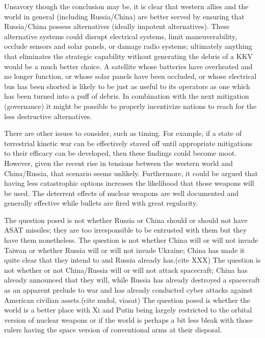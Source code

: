 Unsavory though the conclusion may be, it is clear that western allies
and the world in general (including Russia/China) are better served by
ensuring that Russia/China possess alternatives (ideally impotent
alternatives).  These alternative systems could disrupt electrical
systems, limit maneuverability, occlude sensors and solar panels, or
damage radio systems; ultimately anything that eliminates the
strategic capability without generating the debris of a KKV would be a
much better choice.  A satellite whose batteries have overheated and
no longer function, or whose solar panels have been occluded, or whose
electrical bus has been shorted is likely to be just as useful to its
operators as one which has been turned into a puff of debris.  In
combination with the next mitigation (governance) it might be possible
to properly incentivize nations to reach for the less destructive
alternatives.

There are other issues to consider, such as timing.  For example, if a
state of terrestrial kinetic war can be effectively staved off until
appropriate mitigations to their efficacy can be developed, then these
findings could become moot.  However, given the recent rise in
tensions between the western world and China/Russia, that scenario
seems unlikely.  Furthermore, it could be argued that having less
catastrophic options increases the likelihood that those weapons will
be used.  The deterrent effects of nuclear weapons are well documented
and generally effective\cite[mad]{xxx} while bullets are fired with
great regularity.

The question posed is not whether Russia or China should or should not
have ASAT missiles; they are too irresponsible to be entrusted with
them but they have them nonetheless.  The question is not whether
China will or will not invade Taiwan or whether Russia will or will
not invade Ukraine; China has made it quite clear that they intend to
and Russia already has.(cite XXX) The question is not whether or not
China/Russia will or will not attack spacecraft; China has already
announced that they will, while Russia has already destroyed a
spacecraft as an apparent prelude to war and has already conducted
cyber attacks against American civilian assets.(cite nudol, viasat)
The question posed is whether the world is a better place with Xi and
Putin being largely restricted to the orbital version of nuclear
weapons or if the world is perhaps a bit less bleak with those rulers
having the space version of conventional arms at their disposal.

